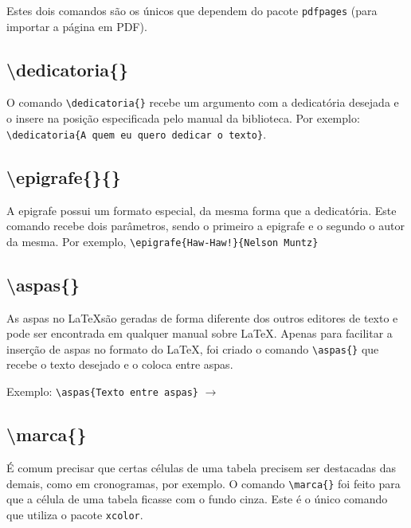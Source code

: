  Estes dois comandos são os únicos que dependem do pacote \verb+pdfpages+ (para importar a página em PDF).

    \subsection{\textbackslash dedicatoria\{\}}
    O comando \verb+\dedicatoria{}+ recebe um argumento com a dedicatória desejada e o insere na posição especificada pelo manual da biblioteca. Por exemplo: \\ \verb+\dedicatoria{A quem eu quero dedicar o texto}+.
    
    \subsection{\textbackslash epigrafe\{\}\{\}}
    A epigrafe possui um formato especial, da mesma forma que a dedicatória. Este comando recebe dois parâmetros, sendo o primeiro a epigrafe e o segundo o autor da mesma. Por exemplo, \verb+\epigrafe{Haw-Haw!}{Nelson Muntz}+
    
    \subsection{\textbackslash aspas\{\}}
    As aspas no \LaTeX são geradas de forma diferente dos outros editores de texto e pode ser encontrada em qualquer manual sobre \LaTeX. Apenas para facilitar a inserção de aspas no formato do \LaTeX, foi criado o comando \verb+\aspas{}+ que recebe o texto desejado e o coloca entre aspas.

    Exemplo: \verb+\aspas{Texto entre aspas}+ $\to$ 
    
    \subsection{\textbackslash marca\{\}}
    É comum precisar que certas células de uma tabela precisem ser destacadas das demais, como em cronogramas, por exemplo. O comando \verb+\marca{}+ foi feito para que a célula de uma tabela ficasse com o fundo cinza. Este é o único comando que utiliza o pacote \verb+xcolor+.

